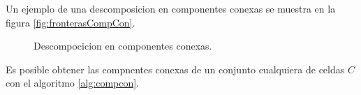 Un ejemplo de una descomposicion en componentes conexas se muestra en la figura \ref{fig:fronterasCompCon}.

\begin{figure}[H]
  \centering
  \qquad

  \caption{Descompocicion en componentes conexas.}\label{fig:descCompCon}
\end{figure}

Es posible obtener las compnentes conexas de un conjunto cualquiera de
celdas $C$ con el algoritmo \ref{alg:compcon}.

